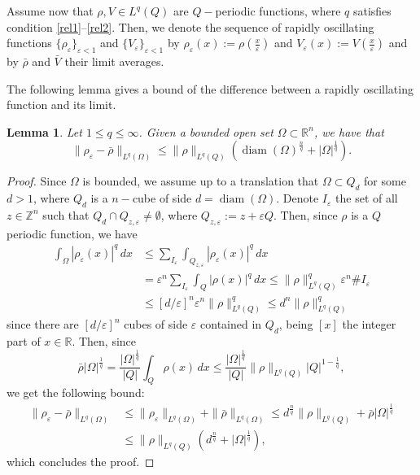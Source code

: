 \documentclass[12pt]{amsart}
\newtheorem{lema}[thm]{Lemma}
\theoremstyle{definition}
\theoremstyle{remark}
\numberwithin{equation}{section}
\begin{document}
Assume now that  $\rho,V\in L^q(Q)$ are $Q-$periodic functions, where $q$ satisfies condition \eqref{rel1}--\eqref{rel2}. Then, we denote the sequence of rapidly oscillating functions $\{\rho_\varepsilon\}_{\varepsilon<1}$ and $\{V_\varepsilon\}_{\varepsilon<1}$ by $\rho_\varepsilon(x):=\rho(\tfrac{x}{\varepsilon})$ and $V_\varepsilon(x):=V(\tfrac{x}{\varepsilon})$ and by $\bar \rho$ and $\bar V$ their limit averages.

The following lemma gives a bound of the difference between a rapidly oscillating function and its limit.

\begin{lema} \label{cota.rho}
Let $1\leq q\leq \infty$. Given a bounded open set $\Omega\subset \mathbb R^n$,  we have that
$$
\|\rho_\varepsilon - \bar \rho\|_{L^q(\Omega)} \leq 
\|\rho\|_{L^q(Q)}\left( \mathop{diam}(\Omega)^\frac{n}{q} + |\Omega|^\frac1q \right).
$$
\end{lema}

\begin{proof}


Since $\Omega$ is bounded, we assume up to a translation  that $\Omega\subset Q_d$ for some $d>1$, where $Q_d$ is a $n-$cube of side $d=\mathop{diam}(\Omega)$. Denote $I_\varepsilon$ the set of all $z\in \mathbb{Z}^n$ such that $Q_d\cap Q_{z,\varepsilon} \neq \emptyset$, where $Q_{z,\varepsilon}:=z+ \varepsilon Q$. Then, since $\rho$ is a $Q$ periodic function, we have
\begin{align*}
\int_\Omega |\rho_\varepsilon(x)|^q \,dx &\leq  \sum_{I_\varepsilon}\int_{Q_{z,\varepsilon}} |\rho_\varepsilon(x)|^q\,dx\\
&=  \varepsilon^n \sum_{I_\varepsilon}\int_{Q} |\rho(x)|^q\,dx \leq \|\rho\|_{L^q(Q)}^q \varepsilon^n \# I_\varepsilon\\
&\leq
[d/\varepsilon]^n \varepsilon^n  \|\rho\|_{L^q(Q)}^q \leq
d^n  \|\rho\|_{L^q(Q)}^q
\end{align*}
since there are $[d/\varepsilon]^n$ cubes of side $\varepsilon$ contained in $Q_d$, being $[x]$ the integer part of $x\in\mathbb R$. Then, since 
$$
\bar \rho |\Omega|^\frac1q =  \frac{|\Omega|^\frac1q}{|Q|} \int_Q \rho(x)\,dx \leq 
\frac{|\Omega|^\frac1q}{|Q|} \|\rho\|_{L^q(Q)} |Q|^{1-\frac1q},
$$
we get the following bound:
\begin{align*}
\|\rho_\varepsilon - \bar \rho\|_{L^q(\Omega)} &\leq \|\rho_\varepsilon\|_{L^q(\Omega)} + \|\bar\rho\|_{L^q(\Omega)} \leq d^\frac{n}{q}  \|\rho\|_{L^q(Q)} + \bar\rho |\Omega|^\frac1q \\
&\leq    \|\rho\|_{L^q(Q)}\left( d^\frac{n}{q} + |\Omega|^\frac1q \right),
\end{align*}
which concludes the proof.
\end{proof}
\end{document}
